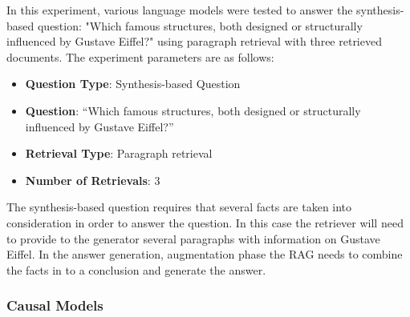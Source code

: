 \documentclass{wseas}
\begin{document}
In this experiment, various language models were tested to answer the
synthesis-based question: "Which famous structures, both designed or
structurally influenced by Gustave Eiffel?" using paragraph retrieval
with three retrieved documents. The experiment parameters are as
follows:

\begin{itemize}

\item
  \textbf{Question Type}: Synthesis-based Question
\item
  \textbf{Question}: ``Which famous structures, both designed or
  structurally influenced by Gustave Eiffel?''
\item
  \textbf{Retrieval Type}: Paragraph retrieval
\item
  \textbf{Number of Retrievals}: 3
\end{itemize}

The synthesis-based question requires that several facts are taken into
consideration in order to answer the question. In this case the
retriever will need to provide to the generator several paragraphs with
information on Gustave Eiffel. In the answer generation, augmentation phase 
the RAG needs to combine the facts in to a conclusion and generate the answer.

\subsubsection{Causal Models}

\end{document}
